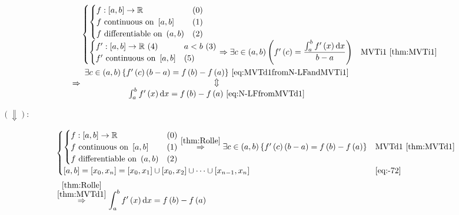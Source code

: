 \documentclass[
]{book}
\theoremstyle{definition}
\theoremstyle{definition}
\theoremstyle{definition}
\theoremstyle{definition}
\theoremstyle{remark}
\begin{document}
\[
\begin{aligned}
 & \begin{cases}
\begin{cases}
f:\left[a,b\right]\rightarrow\mathbb{R} & \left(0\right)\\
f\text{ continuous on }\left[a,b\right] & \left(1\right)\\
f\text{ differentiable on }\left(a,b\right) & \left(2\right)
\end{cases}\\
\begin{cases}
f^{\prime}:\left[a,b\right]\rightarrow\mathbb{R}\,\left(4\right) & a<b\,\left(3\right)\\
f^{\prime}\text{ continuous on }\left[a,b\right] & \left(5\right)
\end{cases}\Rightarrow\exists c\in\left(a,b\right)\left(f^{\prime}\left(c\right)=\dfrac{\int_{a}^{b}f^{\prime}\left(x\right)\mathrm{d}x}{b-a}\right) & \text{MVTi1 }\ref{thm:MVTi1}
\end{cases}\\
\Rightarrow & \begin{array}{c}
\exists c\in\left(a,b\right)\left\{ f^{\prime}\left(c\right)\left(b-a\right)=f\left(b\right)-f\left(a\right)\right\} \,\ref{eq:MVTd1fromN-LFandMVTi1}\\
\Updownarrow\\
\int_{a}^{b}f^{\prime}\left(x\right)\mathrm{d}x=f\left(b\right)-f\left(a\right)\,\ref{eq:N-LFfromMVTd1}
\end{array}
\end{aligned}
\]

\(\left(\Downarrow\right)\):

\[
\begin{aligned}
 & \begin{cases}
\begin{cases}
f:\left[a,b\right]\rightarrow\mathbb{R} & \left(0\right)\\
f\text{ continuous on }\left[a,b\right] & \left(1\right)\\
f\text{ differentiable on }\left(a,b\right) & \left(2\right)
\end{cases}\overset{\ref{thm:Rolle}}{\Rightarrow}\exists c\in\left(a,b\right)\left\{ f^{\prime}\left(c\right)\left(b-a\right)=f\left(b\right)-f\left(a\right)\right\}  & \text{MVTd1 }\ref{thm:MVTd1}\\
\left[a,b\right]=\left[x_{0},x_{n}\right]=\left[x_{0},x_{1}\right]\cup\left[x_{0},x_{2}\right]\cup\cdots\cup\left[x_{n-1},x_{n}\right] & \ref{eq:-72}
\end{cases}\nonumber \\
 & \overset{\stackrel{\ref{thm:Rolle}}{\ref{thm:MVTd1}}}{\Rightarrow}\int_{a}^{b}f^{\prime}\left(x\right)\mathrm{d}x=f\left(b\right)-f\left(a\right)\label{eq:N-LFfromMVTd1}
\end{aligned}
\]
\end{document}

